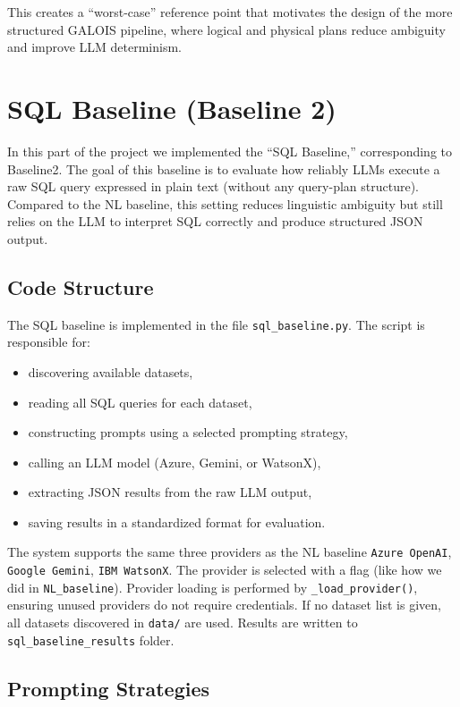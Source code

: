 \documentclass[12pt]{article}
\begin{document}
This creates a ``worst-case'' reference point that motivates the design of the more structured GALOIS pipeline, where logical and physical plans reduce ambiguity and improve LLM determinism.


\section{SQL Baseline (Baseline 2)}

In this part of the project we implemented the ``SQL Baseline,'' corresponding to Baseline2.  
The goal of this baseline is to evaluate how reliably LLMs execute a raw SQL query expressed in plain text (without any query-plan structure).  
Compared to the NL baseline, this setting reduces linguistic ambiguity but still relies on the LLM to interpret SQL correctly and produce structured JSON output.

\subsection{Code Structure}

The SQL baseline is implemented in the file \texttt{sql\_baseline.py}. 
The script is responsible for:
\begin{itemize}
    \item discovering available datasets,
    \item reading all SQL queries for each dataset,
    \item constructing prompts using a selected prompting strategy,
    \item calling an LLM model (Azure, Gemini, or WatsonX),
    \item extracting JSON results from the raw LLM output,
    \item saving results in a standardized format for evaluation.
\end{itemize}

The system supports the same three providers as the NL baseline \texttt{Azure OpenAI}, \texttt{Google Gemini}, \texttt{IBM WatsonX}. The provider is selected with a flag (like how we did in \texttt{NL\_baseline}).  
Provider loading is performed by \verb|_load_provider()|, ensuring unused providers do not require credentials. If no dataset list is given, all datasets discovered in \texttt{data/} are used.  
Results are written to \texttt{sql\_baseline\_results}  folder.

\subsection{Prompting Strategies}
\end{document}
